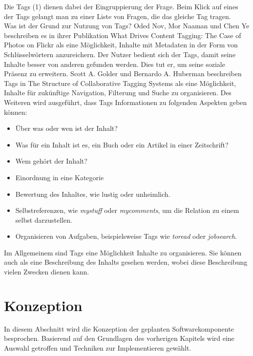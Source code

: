 \documentclass[a4paper]{article}
\begin{document}
	Die Tags (1) dienen dabei der Eingruppierung der Frage. Beim Klick auf eines
	der Tags gelangt man zu einer Liste von Fragen, die das gleiche Tag tragen. \\
	
	Was ist der Grund zur Nutzung von Tags? Oded Nov, Mor Naaman und Chen Ye
	beschreiben es in ihrer Publikation What Drives Content Tagging: The Case of
	Photos on Flickr \cite{CaseTag} als eine Möglichkeit, Inhalte mit Metadaten
	in der Form von Schlüsselwörtern anzureichern. Der Nutzer bedient sich der Tags, 
	damit seine Inhalte besser von anderen gefunden werden. Dies tut er, um seine
	soziale	Präsenz zu erweitern. Scott A. Golder und Bernardo A. Huberman
	beschreiben Tags in The Structure of Collaborative Tagging 
	Systems \cite{CollTag} als eine	Möglichkeit, Inhalte für zukünftige Navigation,
	Filterung und Suche zu organisieren. Des Weiteren wird ausgeführt, dass Tags
	Informationen zu folgenden Aspekten geben können:
	
	\begin{itemize}
		\item Über was oder wen ist der Inhalt?
		\item Was für ein Inhalt ist es, ein Buch oder ein Artikel
		in einer Zeitschrift?
		\item Wem gehört der Inhalt?
		\item Einordnung in eine Kategorie
		\item Bewertung des Inhaltes, wie lustig oder unheimlich.
		\item Selbstreferenzen, wie \emph{mystuff} oder \emph{mycomments},
		um die Relation zu einem selbst darzustellen.
		\item Organisieren von Aufgaben, beispielsweise Tags wie \emph{toread} oder
		\emph{jobsearch}.
	\end{itemize}
	
	Im Allgemeinem sind Tags eine Möglichkeit Inhalte zu organisieren. Sie können
	auch als eine Beschreibung des Inhalts gesehen werden, wobei diese Beschreibung
	vielen Zwecken dienen kann.
		
	\newpage
	
	\section{Konzeption}	
	
	In diesem Abschnitt wird die Konzeption der geplanten Softwarekomponente
	besprochen. Basierend auf den Grundlagen des vorherigen Kapitels wird eine
	Auswahl getroffen und Techniken zur Implementieren gewählt.
	
\end{document}
